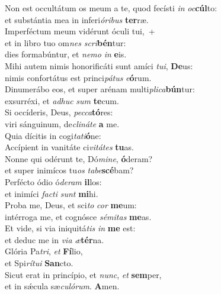 \evenverse Non est occultátum os meum a te, quod fecísti \textit{in} \textit{oc}\textbf{cúl}to:~\*\\
\evenverse et substántia mea in inferi\textit{ó}\textit{ri}\textit{bus} \textbf{ter}ræ.\\
\oddverse Imperféctum meum vidérunt óculi tui,~+\\
\oddverse  et in libro tuo om\textit{nes} \textit{scri}\textbf{bén}tur:~\*\\
\oddverse dies formabúntur, et \textit{ne}\textit{mo} \textit{in} \textbf{e}is.\\
\evenverse Mihi autem nimis honorificáti sunt amíci \textit{tu}\textit{i}, \textbf{De}us:~\*\\
\evenverse nimis confortátus est princi\textit{pá}\textit{tus} \textit{e}\textbf{ó}rum.\\
\oddverse Dinumerábo eos, et super arénam multi\textit{pli}\textit{ca}\textbf{bún}tur:~\*\\
\oddverse exsurréxi, et \textit{a}\textit{dhuc} \textit{sum} \textbf{te}cum.\\
\evenverse Si occíderis, Deus, \textit{pec}\textit{ca}\textbf{tó}res:~\*\\
\evenverse viri sánguinum, de\textit{cli}\textit{ná}\textit{te} \textbf{a} me.\\
\oddverse Quia dícitis in cogi\textit{ta}\textit{ti}\textbf{ó}ne:~\*\\
\oddverse Accípient in vanitáte ci\textit{vi}\textit{tá}\textit{tes} \textbf{tu}as.\\
\evenverse Nonne qui odérunt te, Dó\textit{mi}\textit{ne}, \textbf{ó}deram?~\*\\
\evenverse et super inimícos tu\textit{os} \textit{ta}\textit{be}\textbf{scé}bam?\\
\oddverse Perfécto ódio ó\textit{de}\textit{ram} \textbf{il}los:~\*\\
\oddverse et inimíci \textit{fa}\textit{cti} \textit{sunt} \textbf{mi}hi.\\
\evenverse Proba me, Deus, et sci\textit{to} \textit{cor} \textbf{me}um:~\*\\
\evenverse intérroga me, et cognósce \textit{sé}\textit{mi}\textit{tas} \textbf{me}as.\\
\oddverse Et vide, si via iniquitá\textit{tis} \textit{in} \textbf{me} est:~\*\\
\oddverse et deduc me in \textit{vi}\textit{a} \textit{æ}\textbf{tér}na.\\
\evenverse Glória Pa\textit{tri}, \textit{et} \textbf{Fí}lio,~\*\\
\evenverse et Spi\textit{rí}\textit{tu}\textit{i} \textbf{San}cto.\\
\oddverse Sicut erat in princípio, et \textit{nunc}, \textit{et} \textbf{sem}per,~\*\\
\oddverse et in sǽcula sæ\textit{cu}\textit{ló}\textit{rum}. \textbf{A}men.\\
